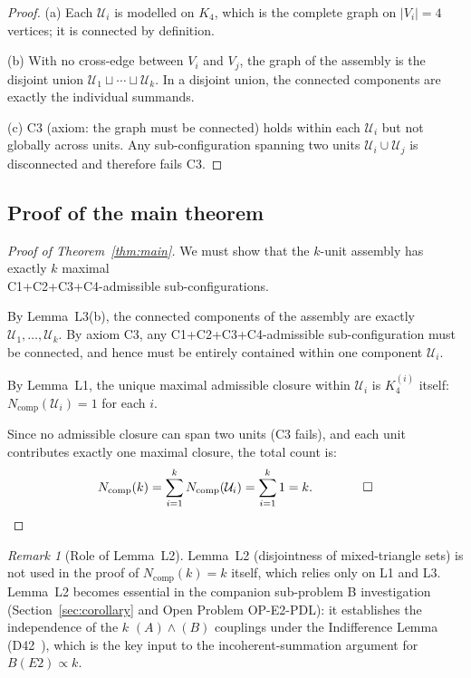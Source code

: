 \documentclass[11pt,a4paper]{article}
\theoremstyle{definition}
\theoremstyle{remark}
\newtheorem{remark}[theorem]{Remark}
\newcommand{\Kfour}{K_4}
\newcommand{\Ncomp}{N_{\mathrm{comp}}}
\begin{document}
\begin{proof}
(a) Each $\mathcal{U}_i$ is modelled on $\Kfour$, which is the complete graph on $|V_i| = 4$ vertices; it is connected by definition.

(b) With no cross-edge between $V_i$ and $V_j$, the graph of the assembly is the disjoint union $\mathcal{U}_1 \sqcup \cdots \sqcup \mathcal{U}_k$. In a disjoint union, the connected components are exactly the individual summands.

(c) C3 (axiom: the graph must be connected) holds within each $\mathcal{U}_i$ but not globally across units. Any sub-configuration spanning two units $\mathcal{U}_i \cup \mathcal{U}_j$ is disconnected and therefore fails C3.
\end{proof}

\subsection{Proof of the main theorem}

\begin{proof}[Proof of Theorem~\ref{thm:main}]
We must show that the $k$-unit assembly has exactly $k$ maximal \\ C1+C2+C3+C4-admissible sub-configurations.

By Lemma~L3(b), the connected components of the assembly are exactly $\mathcal{U}_1, \ldots, \mathcal{U}_k$. By axiom C3, any C1+C2+C3+C4-admissible sub-configuration must be connected, and hence must be entirely contained within one component $\mathcal{U}_i$.

By Lemma~L1, the unique maximal admissible closure within $\mathcal{U}_i$ is $\Kfour^{(i)}$ itself: $\Ncomp(\mathcal{U}_i) = 1$ for each $i$.

Since no admissible closure can span two units (C3 fails), and each unit contributes exactly one maximal closure, the total count is:
\begin{equation}
  \Ncomp(k) = \sum_{i=1}^{k} \Ncomp(\mathcal{U}_i) = \sum_{i=1}^{k} 1 = k.
  \qquad\qed
\end{equation}
\end{proof}

\begin{remark}[Role of Lemma~L2]
Lemma~L2 (disjointness of mixed-triangle sets) is not used in the proof of $\Ncomp(k) = k$ itself, which relies only on L1 and L3. Lemma~L2 becomes essential in the companion sub-problem B investigation (Section~\ref{sec:corollary} and Open Problem OP-E2-PDL): it establishes the independence of the $k$ $(A)\wedge(B)$ couplings under the Indifference Lemma (D42~\cite{PDL_D42}), which is the key input to the incoherent-summation argument for $B(E2) \propto k$.
\end{remark}
\end{document}
